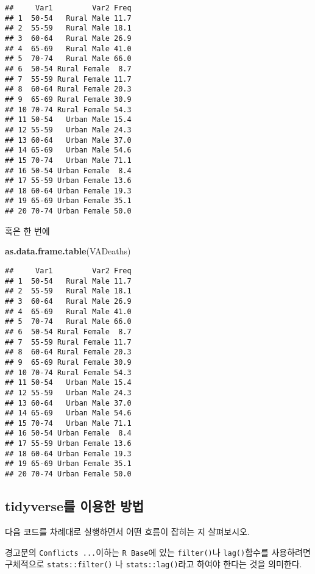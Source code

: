 \documentclass[
]{article}
\newenvironment{Shaded}{\begin{snugshade}}{\end{snugshade}}
\newcommand{\KeywordTok}[1]{\textcolor[rgb]{0.13,0.29,0.53}{\textbf{#1}}}
\newcommand{\NormalTok}[1]{#1}
\begin{document}
\begin{verbatim}
##     Var1         Var2 Freq
## 1  50-54   Rural Male 11.7
## 2  55-59   Rural Male 18.1
## 3  60-64   Rural Male 26.9
## 4  65-69   Rural Male 41.0
## 5  70-74   Rural Male 66.0
## 6  50-54 Rural Female  8.7
## 7  55-59 Rural Female 11.7
## 8  60-64 Rural Female 20.3
## 9  65-69 Rural Female 30.9
## 10 70-74 Rural Female 54.3
## 11 50-54   Urban Male 15.4
## 12 55-59   Urban Male 24.3
## 13 60-64   Urban Male 37.0
## 14 65-69   Urban Male 54.6
## 15 70-74   Urban Male 71.1
## 16 50-54 Urban Female  8.4
## 17 55-59 Urban Female 13.6
## 18 60-64 Urban Female 19.3
## 19 65-69 Urban Female 35.1
## 20 70-74 Urban Female 50.0
\end{verbatim}

혹은 한 번에

\begin{Shaded}
\begin{Highlighting}[]
\KeywordTok{as.data.frame.table}\NormalTok{(VADeaths)}
\end{Highlighting}
\end{Shaded}

\begin{verbatim}
##     Var1         Var2 Freq
## 1  50-54   Rural Male 11.7
## 2  55-59   Rural Male 18.1
## 3  60-64   Rural Male 26.9
## 4  65-69   Rural Male 41.0
## 5  70-74   Rural Male 66.0
## 6  50-54 Rural Female  8.7
## 7  55-59 Rural Female 11.7
## 8  60-64 Rural Female 20.3
## 9  65-69 Rural Female 30.9
## 10 70-74 Rural Female 54.3
## 11 50-54   Urban Male 15.4
## 12 55-59   Urban Male 24.3
## 13 60-64   Urban Male 37.0
## 14 65-69   Urban Male 54.6
## 15 70-74   Urban Male 71.1
## 16 50-54 Urban Female  8.4
## 17 55-59 Urban Female 13.6
## 18 60-64 Urban Female 19.3
## 19 65-69 Urban Female 35.1
## 20 70-74 Urban Female 50.0
\end{verbatim}

\hypertarget{tidyverseuxb97c-uxc774uxc6a9uxd55c-uxbc29uxbc95}{%
\subsection{tidyverse를 이용한
방법}\label{tidyverseuxb97c-uxc774uxc6a9uxd55c-uxbc29uxbc95}}

다음 코드를 차례대로 실행하면서 어떤 흐름이 잡히는 지 살펴보시오.

경고문의 \texttt{Conflicts\ ...}이하는 \texttt{R\ Base}에 있는
\texttt{filter()}나 \texttt{lag()}함수를 사용하려면 구체적으로
\texttt{stats::filter()} 나 \texttt{stats::lag()}라고 하여야 한다는 것을
의미한다.
\end{document}
